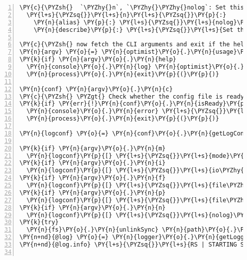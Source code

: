 \begin{Verbatim}[fontsize=\scriptsize,commandchars=\\\{\},numbers=left,firstnumber=1,stepnumber=1]
\PY{c}{\PYZsh{}  `\PYZhy{}n`, `\PYZhy{}\PYZhy{}nolog`: Set this true if no output shall be generated}
  \PY{l+s}{\PYZsq{}}\PY{l+s}{n}\PY{l+s}{\PYZsq{}}\PY{p}{:}
    \PY{n}{alias} \PY{p}{:} \PY{l+s}{\PYZsq{}}\PY{l+s}{nolog}\PY{l+s}{\PYZsq{}}\PY{p}{,}
    \PY{n}{describe}\PY{p}{:} \PY{l+s}{\PYZsq{}}\PY{l+s}{Set this if no output shall be generated}\PY{l+s}{\PYZsq{}}

\PY{c}{\PYZsh{} now fetch the CLI arguments and exit if the help has been called.}
\PY{n}{argv} \PY{o}{=} \PY{n}{optimist}\PY{o}{.}\PY{n}{usage}\PY{p}{(} \PY{n}{usage} \PY{p}{)}\PY{o}{.}\PY{n}{options}\PY{p}{(} \PY{n}{opt} \PY{p}{)}\PY{o}{.}\PY{n}{argv}
\PY{k}{if} \PY{n}{argv}\PY{o}{.}\PY{n}{help}
  \PY{n}{console}\PY{o}{.}\PY{n}{log} \PY{n}{optimist}\PY{o}{.}\PY{n}{help}\PY{p}{(}\PY{p}{)}
  \PY{n}{process}\PY{o}{.}\PY{n}{exit}\PY{p}{(}\PY{p}{)}

\PY{n}{conf} \PY{n}{argv}\PY{o}{.}\PY{n}{c}
\PY{c}{\PYZsh{} \PYZgt{} Check whether the config file is ready, which is required to start the server.}
\PY{k}{if} \PY{err}{!}\PY{n}{conf}\PY{o}{.}\PY{n}{isReady}\PY{p}{(}\PY{p}{)}
  \PY{n}{console}\PY{o}{.}\PY{n}{error} \PY{l+s}{\PYZsq{}}\PY{l+s}{FAIL: Config file not ready! Shutting down...}\PY{l+s}{\PYZsq{}}
  \PY{n}{process}\PY{o}{.}\PY{n}{exit}\PY{p}{(}\PY{p}{)}

\PY{n}{logconf} \PY{o}{=} \PY{n}{conf}\PY{o}{.}\PY{n}{getLogConf}\PY{p}{(}\PY{p}{)}

\PY{k}{if} \PY{n}{argv}\PY{o}{.}\PY{n}{m}
  \PY{n}{logconf}\PY{p}{[} \PY{l+s}{\PYZsq{}}\PY{l+s}{mode}\PY{l+s}{\PYZsq{}} \PY{p}{]} \PY{o}{=} \PY{n}{argv}\PY{o}{.}\PY{n}{m}
\PY{k}{if} \PY{n}{argv}\PY{o}{.}\PY{n}{i}
  \PY{n}{logconf}\PY{p}{[} \PY{l+s}{\PYZsq{}}\PY{l+s}{io\PYZhy{}level}\PY{l+s}{\PYZsq{}} \PY{p}{]} \PY{o}{=} \PY{n}{argv}\PY{o}{.}\PY{n}{i}
\PY{k}{if} \PY{n}{argv}\PY{o}{.}\PY{n}{f}
  \PY{n}{logconf}\PY{p}{[} \PY{l+s}{\PYZsq{}}\PY{l+s}{file\PYZhy{}level}\PY{l+s}{\PYZsq{}} \PY{p}{]} \PY{o}{=} \PY{n}{argv}\PY{o}{.}\PY{n}{f}
\PY{k}{if} \PY{n}{argv}\PY{o}{.}\PY{n}{p}
  \PY{n}{logconf}\PY{p}{[} \PY{l+s}{\PYZsq{}}\PY{l+s}{file\PYZhy{}path}\PY{l+s}{\PYZsq{}} \PY{p}{]} \PY{o}{=} \PY{n}{argv}\PY{o}{.}\PY{n}{p}
\PY{k}{if} \PY{n}{argv}\PY{o}{.}\PY{n}{n}
  \PY{n}{logconf}\PY{p}{[} \PY{l+s}{\PYZsq{}}\PY{l+s}{nolog}\PY{l+s}{\PYZsq{}} \PY{p}{]} \PY{o}{=} \PY{n}{true}
\PY{k}{try}
  \PY{n}{fs}\PY{o}{.}\PY{n}{unlinkSync} \PY{n}{path}\PY{o}{.}\PY{n}{resolve} \PY{n}{\PYZus{}\PYZus{}dirname}\PY{p}{,} \PY{l+s}{\PYZsq{}}\PY{l+s}{..}\PY{l+s}{\PYZsq{}}\PY{p}{,} \PY{l+s}{\PYZsq{}}\PY{l+s}{logs}\PY{l+s}{\PYZsq{}}\PY{p}{,} \PY{n}{logconf}\PY{p}{[} \PY{l+s}{\PYZsq{}}\PY{l+s}{file\PYZhy{}path}\PY{l+s}{\PYZsq{}} \PY{p}{]}
\PY{n+nd}{@log} \PY{o}{=} \PY{n}{logger}\PY{o}{.}\PY{n}{getLogger} \PY{n}{logconf}
\PY{n+nd}{@log.info} \PY{l+s}{\PYZsq{}}\PY{l+s}{RS | STARTING SERVER}\PY{l+s}{\PYZsq{}}


\end{Verbatim}
